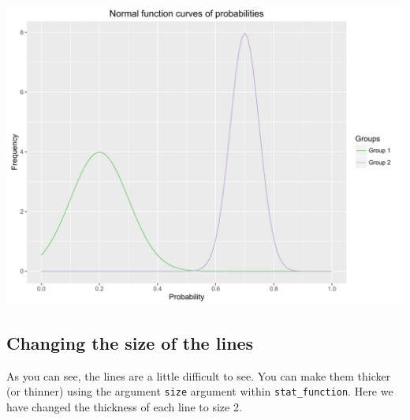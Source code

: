 \documentclass[]{article}
\begin{document}
\begin{center}\includegraphics{0_all_posts_pdf/function_11-1} \end{center}

\subsection{Changing the size of the
lines}\label{changing-the-size-of-the-lines}

As you can see, the lines are a little difficult to see. You can make
them thicker (or thinner) using the argument \texttt{size} argument
within \texttt{stat\_function}. Here we have changed the thickness of
each line to size 2.
\end{document}
